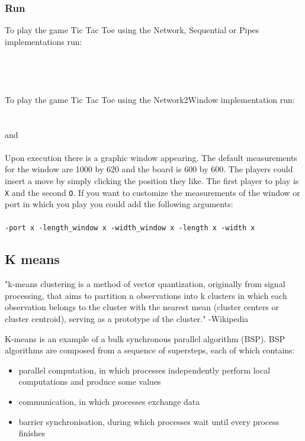 \documentclass[10pt,a4paper]{article}
\begin{document}
\subsubsection{Run}
To play the game Tic Tac Toe using the Network, Sequential or Pipes implementations run:\\\\
\\
\\\\
To play the game Tic Tac Toe using the Network2Window implementation run:\\\\
\\
 \quad and \quad {}\\\\
Upon execution there is a graphic window appearing. The default measurements for the window are 1000 by 620 and the board is 600 by 600. The players could insert a move by simply clicking the position they like. The first player to play is \texttt{X} and the second \texttt{O}. If you want to customize the measurements of the window or port in which you play you could add the following arguments:\\\\
\texttt{-port x -length\_window x -width\_window x -length x -width x}
\subsection{K means}

"k-means clustering is a method of vector quantization, originally from signal processing, that aims to partition n observations into k clusters in which each observation belongs to the cluster with the nearest mean (cluster centers or cluster centroid), serving as a prototype of the cluster."
-Wikipedia

K-means is an example of a bulk synchronous parallel algorithm (BSP). BSP algorithms are composed from a sequence of supersteps, each of which contains:
\begin{itemize}
\item parallel computation, in which processes independently perform local computations and produce some values
\item communication, in which processes exchange data
\item barrier synchronisation, during which processes wait until every process finishes

\end{itemize}
\end{document}
